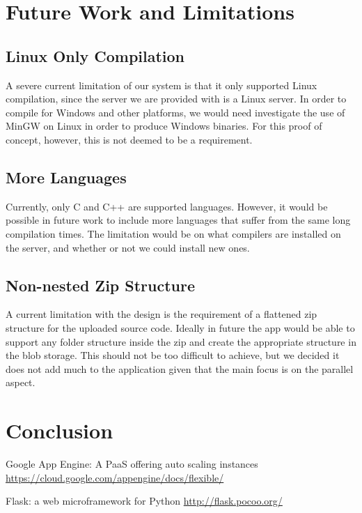\documentclass[conference]{IEEEtran}
\begin{document}
\section{Future Work and Limitations}
\subsection{Linux Only Compilation}
A severe current limitation of our system is that it only supported Linux
compilation, since the server we are provided with is a Linux server. In order
to compile for Windows and other platforms, we would need investigate the use of
MinGW on Linux in order to produce Windows binaries. For this proof of concept,
however, this is not deemed to be a requirement.
\subsection{More Languages}
Currently, only C and C++ are supported languages. However, it would be possible
in future work to include more languages that suffer from the same long
compilation times. The limitation would be on what compilers are installed on
the server, and whether or not we could install new ones.
\subsection{Non-nested Zip Structure}
A current limitation with the design is the requirement of a flattened zip
structure for the uploaded source code. Ideally in future the app would be able
to support any folder structure inside the zip and create the appropriate
structure in the blob storage. This should not be too difficult to achieve, but
we decided it does not add much to the application given that the main focus is
on the parallel aspect.
\section{Conclusion}

\begin{thebibliography}{00}
    Google App Engine: A PaaS offering auto scaling instances
    \url{https://cloud.google.com/appengine/docs/flexible/}

    Flask: a web microframework for Python
    \url{http://flask.pocoo.org/}
\end{thebibliography}
\end{document}
